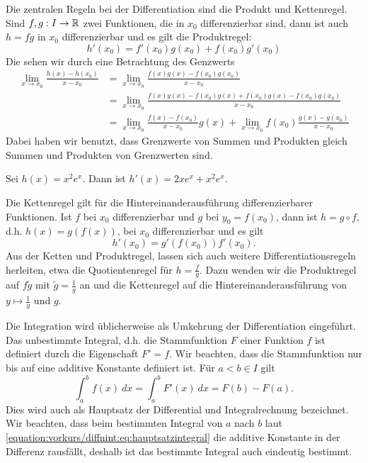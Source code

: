 Die zentralen Regeln bei der Differentiation sind die Produkt  und Kettenregel. Sind \(f, g:I \rightarrow \mathbb{R}\) zwei Funktionen, die in \(x_0\) differenzierbar sind, dann ist auch \(h = f g\) in \(x_0\) differenzierbar und es gilt die Produktregel:
\begin{equation*}
h'(x_0) = f'(x_0) g(x_0) + f(x_0) g'(x_0)\end{equation*}
Die sehen wir durch eine Betrachtung des Genzwerts
\begin{align*}
\lim_{x \rightarrow x_0} \frac{h(x) - h(x_0)}{x-x_0} &= \lim_{x \rightarrow x_0} \frac{f(x)g(x) - f(x_0)g(x_0) }{x-x_0} \\
&= \lim_{x \rightarrow x_0} \frac{f(x)g(x) - f(x_0) g(x) +f(x_0) g(x) - f(x_0)g(x_0) }{x-x_0} \\
&= \lim_{x \rightarrow x_0} \frac{f(x)  - f(x_0)   }{x-x_0} g(x)+
\lim_{x \rightarrow x_0} f(x_0) \frac{  g(x) -  g(x_0) }{x-x_0}
\end{align*}
Dabei haben wir benutzt, dass Grenzwerte von Summen und Produkten gleich Summen und Produkten von Grenzwerten sind.
\label{vorkurs/diffnint:example-2}
\begin{example}{}{}



Sei \(h(x) = x^2 e^x. \) Dann ist \(h'(x) = 2x e^x + x^2 e^x\).
\end{example}

Die Kettenregel gilt für die Hintereinanderausführung differenzierbarer Funktionen. Ist \(f\) bei \(x_0\) differenzierbar und \(g\) bei \(y_0=f(x_0)\), dann ist \(h = g \circ f, \) d.h. \(h(x) = g(f(x))\), bei \(x_0\) differenzierbar und es gilt
\begin{equation*}
 h'(x_0) = g'(f(x_0)) f'(x_0).\end{equation*}
Aus der Ketten  und Produktregel, lassen sich auch weitere Differentiationsregeln herleiten, etwa die Quotientenregel für \(h= \frac{f}g\). Dazu wenden wir die Produktregel auf \(f \tilde g\) mit \(\tilde g = \frac{1}g\) an und die Kettenregel auf die Hintereinanderausführung von \(y \mapsto \frac{1}y\) und \(g\).

Die Integration wird üblicherweise als Umkehrung der Differentiation eingeführt. Das unbestimmte Integral, d.h. die Stammfunktion \(F\) einer Funktion \(f\) ist definiert durch die Eigenschaft \(F'=f\). Wir beachten, dass die Stammfunktion nur bis auf eine additive Konstante definiert ist. Für \(a < b \in I\) gilt
\begin{equation}\label{equation:vorkurs/diffnint:eq:hauptsatzintegral}
\int_a^b f(x) ~dx = \int_a^b F'(x) ~dx = F(b) - F(a). 
\end{equation}
Dies wird auch als Hauptsatz der Differential  und Integralrechnung bezeichnet. Wir beachten, dass beim bestimmten Integral von \(a\) nach \(b\) laut \eqref{equation:vorkurs/diffnint:eq:hauptsatzintegral} die additive Konstante in der Differenz rausfällt, deshalb ist das bestimmte Integral auch eindeutig bestimmt.

